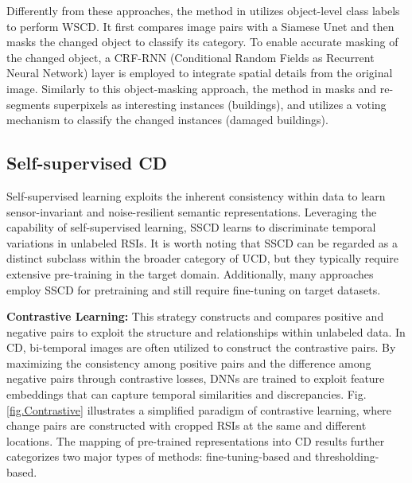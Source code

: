 Differently from these approaches, the method in \cite{andermatt2021weakly} utilizes object-level class labels to perform WSCD. It first compares image pairs with a Siamese Unet and then masks the changed object to classify its category. To enable accurate masking of the changed object, a CRF-RNN (Conditional Random Fields as Recurrent Neural Network) layer is employed to integrate spatial details from the original image. Similarly to this object-masking approach, the method in \cite{qiao2024revolutionizing} masks and re-segments superpixels as interesting instances (buildings), and utilizes a voting mechanism to classify the changed instances (damaged buildings).



\subsection{Self-supervised CD} 

Self-supervised learning exploits the inherent consistency within data to learn sensor-invariant and noise-resilient semantic representations. Leveraging the capability of self-supervised learning, SSCD learns to discriminate temporal variations in unlabeled RSIs. It is worth noting that SSCD can be regarded as a distinct subclass within the broader category of UCD, but they typically require extensive pre-training in the target domain. Additionally, many approaches employ SSCD for pretraining and still require fine-tuning on target datasets.

\textbf{Contrastive Learning:} This strategy constructs and compares positive and negative pairs to exploit the structure and relationships within unlabeled data. In CD, bi-temporal images are often utilized to construct the contrastive pairs. By maximizing the consistency among positive pairs and the difference among negative pairs through contrastive losses, DNNs are trained to exploit feature embeddings that can capture temporal similarities and discrepancies. Fig.\ref{fig.Contrastive} illustrates a simplified paradigm of contrastive learning, where change pairs are constructed with cropped RSIs at the same and different locations. The mapping of pre-trained representations into CD results further categorizes two major types of methods: fine-tuning-based and thresholding-based.

